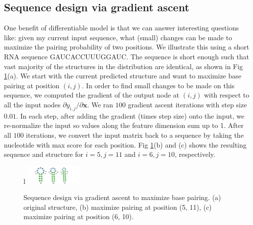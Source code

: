 \documentclass{article}
\begin{document}



%
%

\subsection{Sequence design via gradient ascent}

One benefit of differentiable model is that we can answer interesting questions like:
given my current input sequence, what (small) changes can be made to maximize the pairing probability of two positions.
We illustrate this using a short RNA sequence GAUCACCUUUGGAUC.
The sequence is short enough such that vast majority of the structures in the distribution are identical,
as shown in Fig \ref{fig:gradient_ascent}(a).
We start with the current predicted structure and want to maximize base pairing at position $(i, j)$.
In order to find small changes to be made on this sequence,
we computed the gradient of the output node at $(i, j)$
with respect to all the input nodes ${\partial y_{i,j}}/{\partial \bm{x}}$.
We ran $100$ gradient ascent iterations with step size $0.01$.
In each step, after adding the gradient (times step size) onto the input,
we re-normalize the input so values along the feature dimension sum up to 1.
After all $100$ iterations, we convert the input matrix back to a sequence
by taking the nucleotide with max score for each position.
Fig \ref{fig:gradient_ascent}(b) and (c) shows the resulting sequence and structure
for $i=5, j=11$ and $i=6, j=10$, respectively.



\begin{figure}{l}
    \centering
    \includegraphics[width=0.25\textwidth]{plot/gradient_ascent.pdf}
    \caption{Sequence design via gradient ascent to maximize base pairing. (a) original structure, (b) maximize pairing at position (5, 11), (c) maximize pairing at position (6, 10).}
    \vspace{-8em}
    \label{fig:gradient_ascent}
    \centering
\end{figure}
\end{document}
